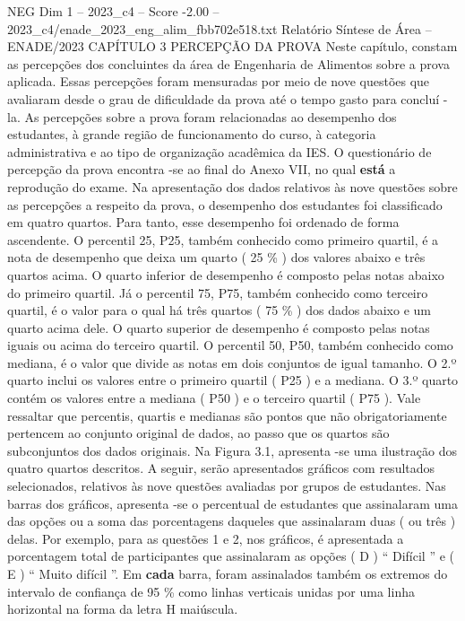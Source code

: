 \begin{textsample}{NEG Dim 1 – 2023\_c4 – Score -2.00 – 2023\_c4/enade\_2023\_eng\_alim\_fbb702e518.txt}  \label{ex:f1_neg_250}
Relatório Síntese de Área – ENADE/2023 CAPÍTULO 3 PERCEPÇÃO DA PROVA Neste capítulo, constam as percepções dos concluintes da área de Engenharia de Alimentos sobre a prova aplicada.
Essas percepções foram mensuradas por meio de nove questões que avaliaram desde o grau de dificuldade da prova até o tempo gasto para concluí -la.
As percepções sobre a prova foram relacionadas ao desempenho dos estudantes, à grande região de funcionamento do curso, à categoria administrativa e ao tipo de organização acadêmica da IES.
O questionário de percepção da prova encontra -se ao final do Anexo VII, no qual \textbf{está} a reprodução do exame.
Na apresentação dos dados relativos às nove questões sobre as percepções a respeito da prova, o desempenho dos estudantes foi classificado em quatro quartos.
Para tanto, esse desempenho foi ordenado de forma ascendente.
O percentil 25, P25, também conhecido como primeiro quartil, é a nota de desempenho que deixa um quarto ( 25 \% ) dos valores abaixo e três quartos acima.
O quarto inferior de desempenho é composto pelas notas abaixo do primeiro quartil.
Já o percentil 75, P75, também conhecido como terceiro quartil, é o valor para o qual há três quartos ( 75 \% ) dos dados abaixo e um quarto acima dele.
O quarto superior de desempenho é composto pelas notas iguais ou acima do terceiro quartil.
O percentil 50, P50, também conhecido como mediana, é o valor que divide as notas em dois conjuntos de igual tamanho.
O 2.º quarto inclui os valores entre o primeiro quartil ( P25 ) e a mediana.
O 3.º quarto contém os valores entre a mediana ( P50 ) e o terceiro quartil ( P75 ).
Vale ressaltar que percentis, quartis e medianas são pontos que não obrigatoriamente pertencem ao conjunto original de dados, ao passo que os quartos são subconjuntos dos dados originais.
Na Figura 3.1, apresenta -se uma ilustração dos quatro quartos descritos.
A seguir, serão apresentados gráficos com resultados selecionados, relativos às nove questões avaliadas por grupos de estudantes.
Nas barras dos gráficos, apresenta -se o percentual de estudantes que assinalaram uma das opções ou a soma das porcentagens daqueles que assinalaram duas ( ou três ) delas.
Por exemplo, para as questões 1 e 2, nos gráficos, é apresentada a porcentagem total de participantes que assinalaram as opções ( D ) “ Difícil ” e ( E ) “ Muito difícil ”.
Em \textbf{cada} barra, foram assinalados também os extremos do intervalo de confiança de 95 \% como linhas verticais unidas por uma linha horizontal na forma da letra H maiúscula.

\end{textsample}
